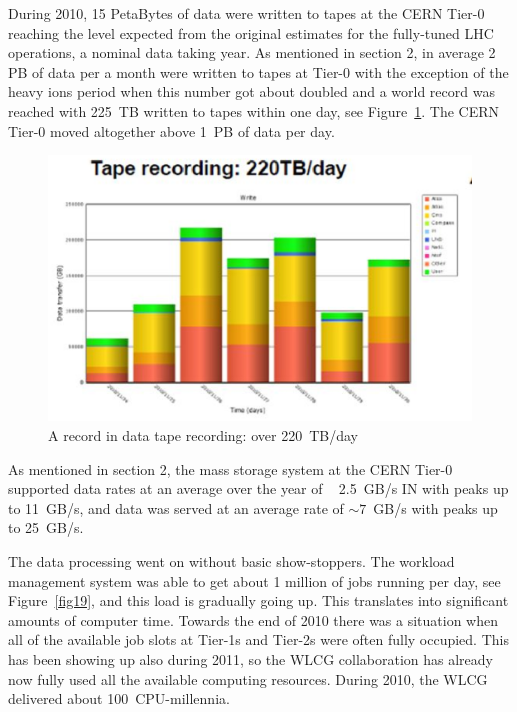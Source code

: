 During 2010, 15 PetaBytes of data were written to tapes at the CERN
Tier-0 reaching the level expected from the original estimates for
the fully-tuned LHC operations, a nominal data taking year. As
mentioned in section 2, in average 2 PB of data per a month were
written to tapes at Tier-0 with the exception of the heavy ions
period when this number got about doubled and a world record was
reached with 225~TB written to tapes within one day, see
Figure~\ref{fig18}. The CERN Tier-0 moved altogether above 1~PB of
data per day.

\begin{figure}[htb] %
\centering
\includegraphics[width=13cm]{fig18.eps} %
\caption{A record in data tape recording: over
220~TB/day}\label{fig18}
\end{figure}


As mentioned in section 2, the mass storage system at the CERN
Tier-0 supported data rates at an average over the year of ~
2.5~GB/s IN with peaks up to 11~GB/s, and data was served at an
average rate of $\sim 7$~GB/s with peaks up to 25~GB/s.

The data processing went on without basic show-stoppers. The
workload management system was able to get about 1 million of jobs
running per day, see Figure~\ref{fig19}, and this load is
gradually going up. This translates into significant amounts of
computer time. Towards the end of 2010 there was a situation when
all of the available job slots at Tier-1s and Tier-2s were often
fully occupied. This has been showing up also during 2011, so the
WLCG collaboration has already now fully used all the available
computing resources. During 2010, the WLCG delivered about
100~CPU-millennia.

